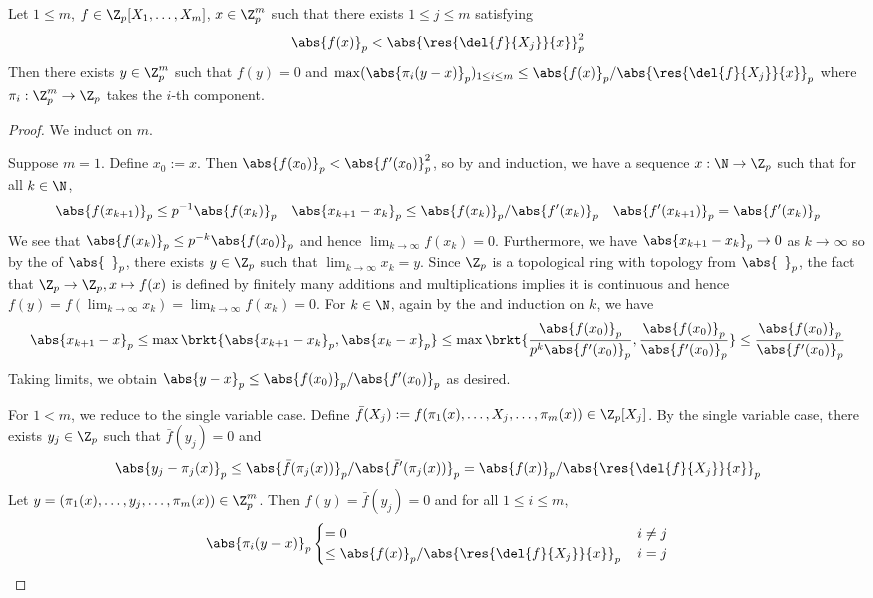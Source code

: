 \begin{prop}
  
  Let $1 \leq m$, $f \in \Z_p[X_1,\dots,X_m]$, $x \in \Z_p^m$ such that 
  there exists $1 \leq j \leq m$ satisfying 
  \[
    \abs{f(x)}_p < \abs{\res{\del{f}{X_j}}{x}}_p^2
  \]
  Then there exists $y \in \Z_p^m$ such that 
  $f(y) = 0$ and $
    \max(\abs{\pi_i(y - x)}_p)_{1\leq i \leq m} 
    \leq {\abs{f(x)}_p}/{\abs{\res{\del{f}{X_j}}{x}}_p}
  $
  where $\pi_i : \Z_p^m \to \Z_p$ takes the $i$-th component.
\end{prop}
\begin{proof}
  We induct on $m$. 

  Suppose $m = 1$. Define $x_0 := x$. 
  Then $\abs{f(x_0)}_p < \abs{f'(x_0)}_p^2$, 
  so by  and induction, 
  we have a sequence $x : \N \to \Z_p$ such that 
  for all $k \in \N$, 
  \begin{align*}
    \abs{f(x_{k+1})}_p \leq p^{-1}\abs{f(x_k)}_p &&
    \abs{x_{k+1} - x_k}_p 
    \leq {\abs{f(x_k)}_p}/{\abs{f'(x_k)}_p} && 
    \abs{f'(x_{k+1})}_p = \abs{f'(x_k)}_p
  \end{align*}
  We see that $\abs{f(x_{k})}_p \leq p^{-k}\abs{f(x_0)}_p$
  and hence $\lim_{k\to\infty} f(x_k) = 0$. 
  Furthermore, we have $\abs{x_{k+1} - x_k}_p \to 0$ as $k \to \infty$ so
  by the  
  of $\abs{\hspace{5pt}}_p$, 
  there exists $y \in \Z_p$ such that $\lim_{k\to\infty} x_k = y$. 
  Since $\Z_p$ is a topological ring with topology from 
  $\abs{\hspace{5pt}}_p$, 
  the fact that $\Z_p \to \Z_p, x \mapsto f(x)$ is defined by finitely many 
  additions and multiplications implies
  it is continuous and hence
  $f(y) = f(\lim_{k\to\infty} x_k) = \lim_{k\to\infty} f(x_k) = 0$.
  For $k \in \N$, again by 
  the  and 
  induction on $k$,
  we have
  \[
    \abs{x_{k+1} - x}_p 
    \leq \max\brkt{\abs{x_{k+1} - x_k}_p, \abs{x_k - x}_p}
    \leq \max\brkt{\frac{\abs{f(x_0)}_p}{p^k \abs{f'(x_0)}_p},
    \frac{\abs{f(x_0)}_p}{\abs{f'(x_0)}_p}
    }
    \leq \frac{\abs{f(x_0)}_p}{\abs{f'(x_0)}_p}
  \]
  Taking limits, we obtain $
    \abs{y - x}_p \leq {\abs{f(x_0)}_p}/{\abs{f'(x_0)}_p}
  $
  as desired. 

  For $1 < m$, we reduce to the single variable case. 
  Define $\bar{f}(X_j) := f(\pi_1(x),\dots,X_j,\dots,\pi_m(x)) \in \Z_p[X_j]$.
  By the single variable case,
  there exists $y_j \in \Z_p$ such that $\bar{f}(y_j) = 0$ and 
  \[
    \abs{y_j - \pi_j(x)}_p 
    \leq {\abs{\bar{f}(\pi_j(x))}_p}/{\abs{\bar{f}'(\pi_j(x))}_p}
    = {\abs{f(x)}_p}/{\abs{\res{\del{f}{X_j}}{x}}_p}
  \]
  Let $y = (\pi_1(x),\dots,y_j,\dots,\pi_m(x))\in \Z_p^m$.
  Then $f(y) = \bar{f}(y_j) = 0$ and for all $1 \leq i \leq m$,
  \[
    \abs{\pi_i(y - x)}_p \begin{cases}
      = 0 &\, i \neq j \\
      \leq {\abs{f(x)}_p}/{\abs{\res{\del{f}{X_j}}{x}}_p} &\, i = j
    \end{cases} 
  \]
\end{proof}

